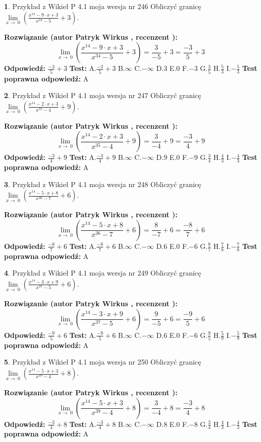\documentclass[12pt, a4paper]{article}
\theoremstyle{definition} %
\newtheorem{zad}{}
\newcommand{\zadStart}[1]{\begin{zad}#1\newline}
\newcommand{\zadStop}{\end{zad}}
\newcommand{\rozwStart}[2]{\noindent \textbf{Rozwiązanie (autor #1 , recenzent #2): }\newline}
\newcommand{\rozwStop}{\newline}
\newcommand{\odpStart}{\noindent \textbf{Odpowiedź:}\newline}
\newcommand{\odpStop}{\newline}
\newcommand{\testStart}{\noindent \textbf{Test:}\newline}
\newcommand{\testStop}{\newline}
\newcommand{\kluczStart}{\noindent \textbf{Test poprawna odpowiedź:}\newline}
\newcommand{\kluczStop}{\newline}
\begin{document}
\zadStart{Przykład z Wikieł P 4.1 moja wersja nr 246}
Obliczyć granicę $\lim\limits_{x\to\ 0}(\frac{x^{14}-9 \cdot x +3}{x^{34}-5}+3)$.
\zadStop
\rozwStart{Patryk Wirkus}{}
$$\lim\limits_{x\to\ 0}(\frac{x^{14}-9 \cdot x +3}{x^{34}-5}+3)=\frac{3}{-5}+3=\frac{-3}{5}+3$$
\rozwStop
\odpStart
$\frac{-3}{5}+3$
\odpStop
\testStart
A.$\frac{-3}{5}+3$
B.$\infty$
C.$-\infty$
D.$3$
E.$0$
F.$-3$
G.$\frac{3}{5}$
H.$\frac{5}{3}$
I.$-\frac{5}{3}$
\testStop
\kluczStart
A
\kluczStop



\zadStart{Przykład z Wikieł P 4.1 moja wersja nr 247}
Obliczyć granicę $\lim\limits_{x\to\ 0}(\frac{x^{14}-2 \cdot x +3}{x^{35}-4}+9)$.
\zadStop
\rozwStart{Patryk Wirkus}{}
$$\lim\limits_{x\to\ 0}(\frac{x^{14}-2 \cdot x +3}{x^{35}-4}+9)=\frac{3}{-4}+9=\frac{-3}{4}+9$$
\rozwStop
\odpStart
$\frac{-3}{4}+9$
\odpStop
\testStart
A.$\frac{-3}{4}+9$
B.$\infty$
C.$-\infty$
D.$9$
E.$0$
F.$-9$
G.$\frac{3}{4}$
H.$\frac{4}{3}$
I.$-\frac{4}{3}$
\testStop
\kluczStart
A
\kluczStop



\zadStart{Przykład z Wikieł P 4.1 moja wersja nr 248}
Obliczyć granicę $\lim\limits_{x\to\ 0}(\frac{x^{14}-5 \cdot x +8}{x^{36}-7}+6)$.
\zadStop
\rozwStart{Patryk Wirkus}{}
$$\lim\limits_{x\to\ 0}(\frac{x^{14}-5 \cdot x +8}{x^{36}-7}+6)=\frac{8}{-7}+6=\frac{-8}{7}+6$$
\rozwStop
\odpStart
$\frac{-8}{7}+6$
\odpStop
\testStart
A.$\frac{-8}{7}+6$
B.$\infty$
C.$-\infty$
D.$6$
E.$0$
F.$-6$
G.$\frac{8}{7}$
H.$\frac{7}{8}$
I.$-\frac{7}{8}$
\testStop
\kluczStart
A
\kluczStop



\zadStart{Przykład z Wikieł P 4.1 moja wersja nr 249}
Obliczyć granicę $\lim\limits_{x\to\ 0}(\frac{x^{14}-3 \cdot x +9}{x^{37}-5}+6)$.
\zadStop
\rozwStart{Patryk Wirkus}{}
$$\lim\limits_{x\to\ 0}(\frac{x^{14}-3 \cdot x +9}{x^{37}-5}+6)=\frac{9}{-5}+6=\frac{-9}{5}+6$$
\rozwStop
\odpStart
$\frac{-9}{5}+6$
\odpStop
\testStart
A.$\frac{-9}{5}+6$
B.$\infty$
C.$-\infty$
D.$6$
E.$0$
F.$-6$
G.$\frac{9}{5}$
H.$\frac{5}{9}$
I.$-\frac{5}{9}$
\testStop
\kluczStart
A
\kluczStop



\zadStart{Przykład z Wikieł P 4.1 moja wersja nr 250}
Obliczyć granicę $\lim\limits_{x\to\ 0}(\frac{x^{14}-5 \cdot x +3}{x^{39}-4}+8)$.
\zadStop
\rozwStart{Patryk Wirkus}{}
$$\lim\limits_{x\to\ 0}(\frac{x^{14}-5 \cdot x +3}{x^{39}-4}+8)=\frac{3}{-4}+8=\frac{-3}{4}+8$$
\rozwStop
\odpStart
$\frac{-3}{4}+8$
\odpStop
\testStart
A.$\frac{-3}{4}+8$
B.$\infty$
C.$-\infty$
D.$8$
E.$0$
F.$-8$
G.$\frac{3}{4}$
H.$\frac{4}{3}$
I.$-\frac{4}{3}$
\testStop
\kluczStart
A
\kluczStop
\end{document}
